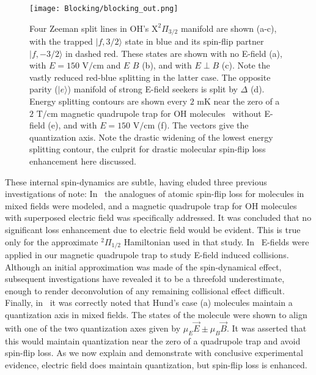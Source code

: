 \documentclass[%
 reprint,
 amsmath,amssymb,
 aps,
prl,
]{revtex4-1}
\newcommand{\epb}{{$E\!\perp\!B$}}
\begin{document}

\begin{figure}[tb]
\texttt{[image: Blocking/blocking\_out.png]}%
\caption{
Four Zeeman split lines in OH's $\mathrm{X}^2\Pi_{3/2}$ manifold are shown (a-c), with the trapped $|f,3/2\rangle$ state in blue and its spin-flip partner $|f,-3/2\rangle$ in dashed red. These states are shown with no E-field (a), with $E=150\text{ V/cm}$ and $E\,$\raisebox{0.5px}{$\parallel$}$\,B$ (b), and with \epb{} (c). Note the vastly reduced red-blue splitting in the latter case. The opposite parity ($|e\rangle$) manifold of strong E-field seekers is split by $\Delta$ (d). Energy splitting contours are shown every $2\text{ mK}$ near the zero of a $2\text{ T/cm}$ magnetic quadrupole trap for OH molecules~\cite{Stuhl2012uwave} without E-field (e), and with $E=150\text{ V/cm}$ (f). The vectors give the quantization axis. Note the drastic widening of the lowest energy splitting contour, the culprit for drastic molecular spin-flip loss enhancement here discussed.
\label{fig:blocking}}
\end{figure}


These internal spin-dynamics are subtle, having eluded three previous investigations of note: In~\cite{Lara2008} the analogues of atomic spin-flip loss for molecules in mixed fields were modeled, and a magnetic quadrupole trap for OH molecules with superposed electric field was specifically addressed. It was concluded that no significant loss enhancement due to electric field would be evident. This is true only for the approximate $^2\Pi_{1/2}$ Hamiltonian used in that study. In~\cite{Stuhl2013} E-fields were applied in our magnetic quadrupole trap to study E-field induced collisions. Although an initial approximation was made of the spin-dynamical effect, subsequent investigations have revealed it to be a threefold underestimate, enough to render deconvolution of any remaining collisional effect difficult. Finally, in~\cite{Bohn2013} it was correctly noted that Hund's case (a) molecules maintain a quantization axis in mixed fields. The states of the molecule were shown to align with one of the two quantization axes given by $\mu_E\vec{E}\pm\mu_B\vec{B}$. It was asserted that this would maintain quantization near the zero of a quadrupole trap and avoid spin-flip loss. As we now explain and demonstrate with conclusive experimental evidence, electric field does maintain quantization, but spin-flip loss is enhanced.
\end{document}
